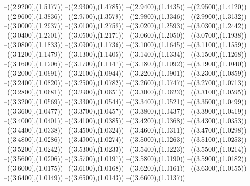 {	--({\sx*(2.9200)},{\sy*(1.5177)})
	--({\sx*(2.9300)},{\sy*(1.4785)})
	--({\sx*(2.9400)},{\sy*(1.4435)})
	--({\sx*(2.9500)},{\sy*(1.4120)})
	--({\sx*(2.9600)},{\sy*(1.3836)})
	--({\sx*(2.9700)},{\sy*(1.3579)})
	--({\sx*(2.9800)},{\sy*(1.3346)})
	--({\sx*(2.9900)},{\sy*(1.3132)})
	--({\sx*(3.0000)},{\sy*(1.2937)})
	--({\sx*(3.0100)},{\sy*(1.2758)})
	--({\sx*(3.0200)},{\sy*(1.2593)})
	--({\sx*(3.0300)},{\sy*(1.2442)})
	--({\sx*(3.0400)},{\sy*(1.2301)})
	--({\sx*(3.0500)},{\sy*(1.2171)})
	--({\sx*(3.0600)},{\sy*(1.2050)})
	--({\sx*(3.0700)},{\sy*(1.1938)})
	--({\sx*(3.0800)},{\sy*(1.1833)})
	--({\sx*(3.0900)},{\sy*(1.1736)})
	--({\sx*(3.1000)},{\sy*(1.1645)})
	--({\sx*(3.1100)},{\sy*(1.1559)})
	--({\sx*(3.1200)},{\sy*(1.1479)})
	--({\sx*(3.1300)},{\sy*(1.1405)})
	--({\sx*(3.1400)},{\sy*(1.1334)})
	--({\sx*(3.1500)},{\sy*(1.1268)})
	--({\sx*(3.1600)},{\sy*(1.1206)})
	--({\sx*(3.1700)},{\sy*(1.1147)})
	--({\sx*(3.1800)},{\sy*(1.1092)})
	--({\sx*(3.1900)},{\sy*(1.1040)})
	--({\sx*(3.2000)},{\sy*(1.0991)})
	--({\sx*(3.2100)},{\sy*(1.0944)})
	--({\sx*(3.2200)},{\sy*(1.0901)})
	--({\sx*(3.2300)},{\sy*(1.0859)})
	--({\sx*(3.2400)},{\sy*(1.0820)})
	--({\sx*(3.2500)},{\sy*(1.0782)})
	--({\sx*(3.2600)},{\sy*(1.0747)})
	--({\sx*(3.2700)},{\sy*(1.0713)})
	--({\sx*(3.2800)},{\sy*(1.0681)})
	--({\sx*(3.2900)},{\sy*(1.0651)})
	--({\sx*(3.3000)},{\sy*(1.0623)})
	--({\sx*(3.3100)},{\sy*(1.0595)})
	--({\sx*(3.3200)},{\sy*(1.0569)})
	--({\sx*(3.3300)},{\sy*(1.0544)})
	--({\sx*(3.3400)},{\sy*(1.0521)})
	--({\sx*(3.3500)},{\sy*(1.0499)})
	--({\sx*(3.3600)},{\sy*(1.0477)})
	--({\sx*(3.3700)},{\sy*(1.0457)})
	--({\sx*(3.3800)},{\sy*(1.0437)})
	--({\sx*(3.3900)},{\sy*(1.0419)})
	--({\sx*(3.4000)},{\sy*(1.0401)})
	--({\sx*(3.4100)},{\sy*(1.0385)})
	--({\sx*(3.4200)},{\sy*(1.0368)})
	--({\sx*(3.4300)},{\sy*(1.0353)})
	--({\sx*(3.4400)},{\sy*(1.0338)})
	--({\sx*(3.4500)},{\sy*(1.0324)})
	--({\sx*(3.4600)},{\sy*(1.0311)})
	--({\sx*(3.4700)},{\sy*(1.0298)})
	--({\sx*(3.4800)},{\sy*(1.0286)})
	--({\sx*(3.4900)},{\sy*(1.0274)})
	--({\sx*(3.5000)},{\sy*(1.0263)})
	--({\sx*(3.5100)},{\sy*(1.0253)})
	--({\sx*(3.5200)},{\sy*(1.0242)})
	--({\sx*(3.5300)},{\sy*(1.0233)})
	--({\sx*(3.5400)},{\sy*(1.0223)})
	--({\sx*(3.5500)},{\sy*(1.0214)})
	--({\sx*(3.5600)},{\sy*(1.0206)})
	--({\sx*(3.5700)},{\sy*(1.0197)})
	--({\sx*(3.5800)},{\sy*(1.0190)})
	--({\sx*(3.5900)},{\sy*(1.0182)})
	--({\sx*(3.6000)},{\sy*(1.0175)})
	--({\sx*(3.6100)},{\sy*(1.0168)})
	--({\sx*(3.6200)},{\sy*(1.0161)})
	--({\sx*(3.6300)},{\sy*(1.0155)})
	--({\sx*(3.6400)},{\sy*(1.0149)})
	--({\sx*(3.6500)},{\sy*(1.0143)})
	--({\sx*(3.6600)},{\sy*(1.0137)})
}
